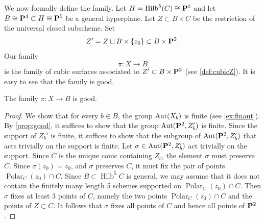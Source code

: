 \documentclass[12pt,reqno]{amsart}
\DeclareMathOperator{\Polar}{Polar}
\DeclareMathOperator{\Hilb}{Hilb}
\renewcommand{\to}{{\longrightarrow}}
\numberwithin{equation}{section}
\begin{document}
We now formally define the family.
Let $H = \Hilb^5(C) \cong \P^5$ and let $B \cong \P^4 \subset H \cong \P^5$ be a general hyperplane.
Let $Z \subset B \times C$ be the restriction of the universal closed subscheme.
Set 
\[Z' = Z \sqcup B \times \{z_0\} \subset B \times \P^2.\]
Our family
\[\pi \colon X \to B\]
is the family of cubic surfaces associated to $Z' \subset B \times \P^2$ (see \autoref{def:cubicZ}).
It is easy to see that the family is good.
\begin{lemma}\label{prop:goodnessB1}
  The family $\pi \colon X \to B$ is good.
\end{lemma}
\begin{proof}
  We show that for every $b \in B$, the group $\Aut(X_b)$ is finite (see \autoref{ex:finaut}).
  By \autoref{prop:good}, it suffices to show that the group $\Aut(\P^2, Z_b')$ is finite.
  Since the support of $Z_b'$ is finite, it suffices to show that the subgroup of $\Aut(\P^2, Z'_b)$ that acts trivially on the support is finite.
  Let $\sigma \in \Aut(\P^2, Z'_b)$ act trivially on the support.
  Since $C$ is the unique conic containing $Z_b$, the element $\sigma$ must preserve $C$.
  Since $\sigma(z_0) = z_0$, and $\sigma$ preserves $C$, it must fix the pair of points $\Polar_C(z_0) \cap C$.
  Since $B \subset \Hilb^5C$ is general, we may assume that it does not contain the finitely many length 5 schemes supported on $\Polar_C(z_0) \cap C$.
  Then $\sigma$ fixes at least 3 points of $C$, namely the two points $\Polar_C(z_0) \cap C$ and the points of $Z \subset C$.
  It follows that $\sigma$ fixes all points of $C$ and hence all points of $\P^2$.
\end{proof}
\end{document}
